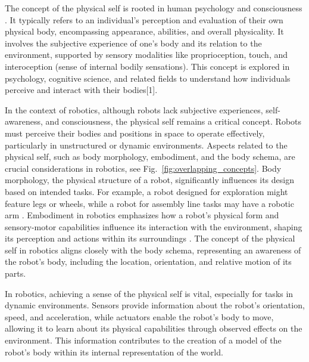 The concept of the physical self is rooted in human psychology and consciousness \cite{Tsakiris2016multisensorybasisself,Overgaard2023selfitsbody}. It typically refers to an individual's perception and evaluation of their own physical body, encompassing appearance, abilities, and overall physicality. It involves the subjective experience of one's body and its relation to the environment, supported by sensory modalities like proprioception, touch, and interoception (sense of internal bodily sensations). This concept is explored in psychology, cognitive science, and related fields to understand how individuals perceive and interact with their bodies[1].

In the context of robotics, although robots lack subjective experiences, self-awareness, and consciousness, the physical self remains a critical concept. Robots must perceive their bodies and positions in space to operate effectively, particularly in unstructured or dynamic environments. Aspects related to the physical self, such as body morphology, embodiment, and the body schema, are crucial considerations in robotics, see Fig.~\ref{fig:overlapping_concepts}. Body morphology, the physical structure of a robot, significantly influences its design based on intended tasks. For example, a robot designed for exploration might feature legs or wheels, while a robot for assembly line tasks may have a robotic arm \cite{Miller2018EmbodimentSituatednessMorphology}. Embodiment in robotics emphasizes how a robot's physical form and sensory-motor capabilities influence its interaction with the environment, shaping its perception and actions within its surroundings \cite{Wainer2006rolephysicalembodiment}. The concept of the physical self in robotics aligns closely with the body schema, representing an awareness of the robot's body, including the location, orientation, and relative motion of its parts.

In robotics, achieving a sense of the physical self is vital, especially for tasks in dynamic environments. Sensors provide information about the robot's orientation, speed, and acceleration, while actuators enable the robot's body to move, allowing it to learn about its physical capabilities through observed effects on the environment. This information contributes to the creation of a model of the robot's body within its internal representation of the world.

